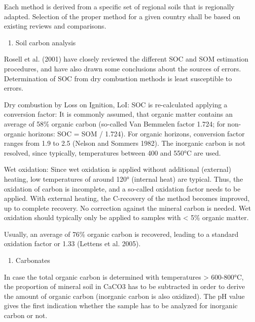 \documentclass[]{book}
\providecommand{\tightlist}{%
  \setlength{\itemsep}{0pt}\setlength{\parskip}{0pt}}
\theoremstyle{definition}
\theoremstyle{definition}
\theoremstyle{definition}
\theoremstyle{remark}
\begin{document}
Each method is derived from a specific set of regional soils that is
regionally adapted. Selection of the proper method for a given country
shall be based on existing reviews and comparisons.

\begin{enumerate}
\def\labelenumi{\alph{enumi})}
\setcounter{enumi}{2}
\tightlist
\item
  Soil carbon analysis
\end{enumerate}

Rosell et al. (2001) have closely reviewed the different SOC and SOM
estimation procedures, and have also drawn some conclusions about the
sources of errors. Determination of SOC from dry combustion methods is
least susceptible to errors.

Dry combustion by Loss on Ignition, LoI: SOC is re-calculated applying a
conversion factor: It is commonly assumed, that organic matter contains
an average of 58\% organic carbon (so-called Van Bemmelen factor 1.724;
for non-organic horizons: SOC = SOM / 1.724). For organic horizons,
conversion factor ranges from 1.9 to 2.5 (Nelson and Sommers 1982). The
inorganic carbon is not resolved, since typically, temperatures between
400 and 550°C are used.

Wet oxidation: Since wet oxidation is applied without additional
(external) heating, low temperatures of around 120° (internal heat) are
typical. Thus, the oxidation of carbon is incomplete, and a so-called
oxidation factor needs to be applied. With external heating, the
C-recovery of the method becomes improved, up to complete recovery. No
correction against the mineral carbon is needed. Wet oxidation should
typically only be applied to samples with \textless{} 5\% organic
matter.

Usually, an average of 76\% organic carbon is recovered, leading to a
standard oxidation factor or 1.33 (Lettens et al. 2005).

\begin{enumerate}
\def\labelenumi{\alph{enumi})}
\setcounter{enumi}{3}
\tightlist
\item
  Carbonates
\end{enumerate}

In case the total organic carbon is determined with temperatures
\textgreater{} 600-800°C, the proportion of mineral soil in CaCO3 has to
be subtracted in order to derive the amount of organic carbon (inorganic
carbon is also oxidized). The pH value gives the first indication
whether the sample has to be analyzed for inorganic carbon or not.
\end{document}
